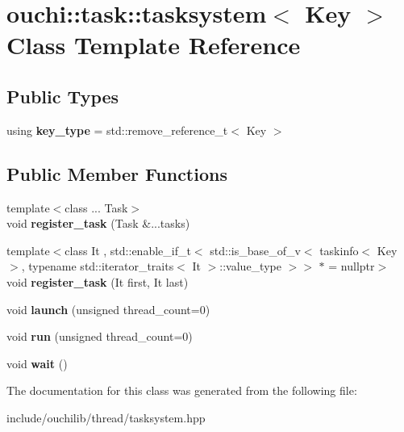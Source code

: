 \hypertarget{classouchi_1_1task_1_1tasksystem}{}\section{ouchi\+::task\+::tasksystem$<$ Key $>$ Class Template Reference}
\label{classouchi_1_1task_1_1tasksystem}
\subsection*{Public Types}
\begin{DoxyCompactItemize}
\item 
\mbox{\label{classouchi_1_1task_1_1tasksystem_a98c09c195e5629bc3e083e2940e733e6}} 
using {\bfseries key\+\_\+type} = std\+::remove\+\_\+reference\+\_\+t$<$ Key $>$
\end{DoxyCompactItemize}
\subsection*{Public Member Functions}
\begin{DoxyCompactItemize}
\item 
\mbox{\label{classouchi_1_1task_1_1tasksystem_a965fd29c9be9dd883d075dbb824dda29}} 
{\footnotesize template$<$class ... Task$>$ }\\void {\bfseries register\+\_\+task} (Task \&...tasks)
\item 
\mbox{\label{classouchi_1_1task_1_1tasksystem_aa398cbeb46970e632f6049e33f8aa357}} 
{\footnotesize template$<$class It , std\+::enable\+\_\+if\+\_\+t$<$ std\+::is\+\_\+base\+\_\+of\+\_\+v$<$ taskinfo$<$ Key $>$, typename std\+::iterator\+\_\+traits$<$ It $>$\+::value\+\_\+type $>$$>$ $\ast$  = nullptr$>$ }\\void {\bfseries register\+\_\+task} (It first, It last)
\item 
\mbox{\label{classouchi_1_1task_1_1tasksystem_a9baec17de9dd7f5bf4ef628c553a9d15}} 
void {\bfseries launch} (unsigned thread\+\_\+count=0)
\item 
\mbox{\label{classouchi_1_1task_1_1tasksystem_aaa6c347579b1d9f5cfa93d0483b5395e}} 
void {\bfseries run} (unsigned thread\+\_\+count=0)
\item 
\mbox{\label{classouchi_1_1task_1_1tasksystem_ac2df79d7ed0d63b43b7a6e91e1b8b0d2}} 
void {\bfseries wait} ()
\end{DoxyCompactItemize}


The documentation for this class was generated from the following file\+:\begin{DoxyCompactItemize}
\item 
include/ouchilib/thread/tasksystem.\+hpp\end{DoxyCompactItemize}
